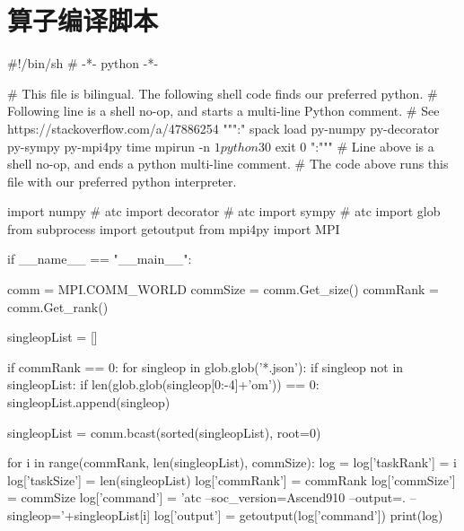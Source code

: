 \chapter{算子编译脚本}

\label{算子编译脚本}

\begin{python}
#!/bin/sh
# -*- python -*-

# This file is bilingual. The following shell code finds our preferred python.
# Following line is a shell no-op, and starts a multi-line Python comment.
# See https://stackoverflow.com/a/47886254
""":"
spack load py-numpy py-decorator py-sympy py-mpi4py
time mpirun -n $1 python3 $0
exit 0
":"""
# Line above is a shell no-op, and ends a python multi-line comment.
# The code above runs this file with our preferred python interpreter.

import numpy  # atc
import decorator  # atc
import sympy  # atc
import glob
from subprocess import getoutput
from mpi4py import MPI

if __name__ == "__main__":

    comm = MPI.COMM_WORLD
    commSize = comm.Get_size()
    commRank = comm.Get_rank()

    singleopList = []

    if commRank == 0:
        for singleop in glob.glob('*.json'):
            if singleop not in singleopList:
                if len(glob.glob(singleop[0:-4]+'om')) == 0:
                    singleopList.append(singleop)

    singleopList = comm.bcast(sorted(singleopList), root=0)

    for i in range(commRank, len(singleopList), commSize):
        log = {}
        log['taskRank'] = i
        log['taskSize'] = len(singleopList)
        log['commRank'] = commRank
        log['commSize'] = commSize
        log['command'] = 'atc --soc_version=Ascend910 --output=. --singleop='+singleopList[i]
        log['output'] = getoutput(log['command'])
        print(log)
\end{python}
